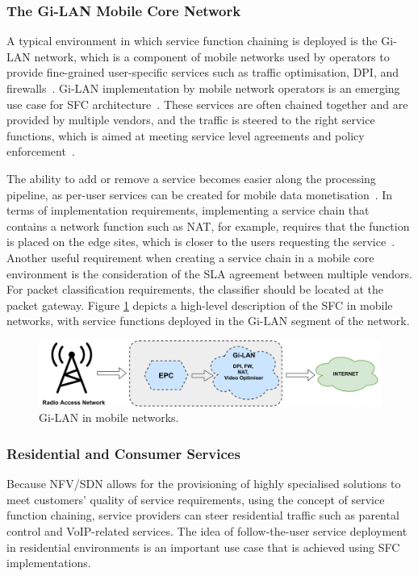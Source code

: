 \documentclass[futureinternet,review,accept,pdftex,moreauthors]{Definitions/mdpi}
\begin{document}
\subsubsection{The Gi-LAN Mobile Core Network}
\label{Gi-LAN}
A typical environment in which service function chaining is deployed is the Gi-LAN network, which is a component of mobile networks used by operators to provide fine-grained user-specific services such as traffic optimisation, DPI, and firewalls~\cite{naik2017libvnf}. Gi-LAN implementation by mobile network operators is an emerging use case for SFC architecture~\cite{turk2019implementation}. These services are often chained together and are provided by multiple vendors, and the traffic is steered to the right service functions, which is aimed at meeting service level agreements and policy enforcement~\cite{kaurroad}.

The ability to add or remove a service becomes easier along the processing pipeline, as per-user services can be created for mobile data monetisation~\cite{brown2015service}. In terms of implementation requirements, implementing a service chain that contains a network function such as NAT, for example, requires that the function is placed on the edge sites, which is closer to the users requesting the service~\cite{shojafar2019recent}. Another useful requirement when creating a service chain in a mobile core environment is the consideration of the SLA agreement between multiple vendors. For packet classification requirements, the classifier should be located at the packet gateway. Figure \ref{Gi-LAN-Figure} depicts a high-level description of the SFC in mobile networks, with service functions deployed in the Gi-LAN segment of the network.


\begin{figure}[H]%
\includegraphics[width=1\columnwidth]{Gi-LAN.pdf}
\caption{Gi-LAN in mobile networks.}
\label{Gi-LAN-Figure}
\end{figure}


\subsubsection{Residential and Consumer Services}
Because NFV/SDN allows for the provisioning of highly specialised solutions to meet customers' quality of service requirements, using the concept of service function chaining, service providers can steer residential traffic such as parental control and VoIP-related services. The idea of follow-the-user service deployment in residential environments is an important use case that is achieved using SFC implementations.
\end{document}
